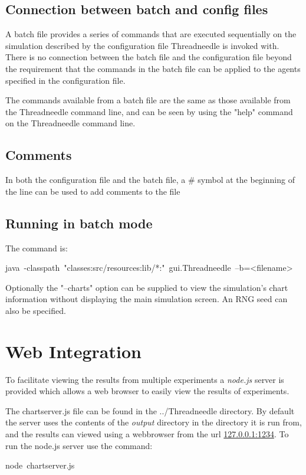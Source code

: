\documentclass[10pt,oneside,openright, a4paper]{memoir}
\begin{document}
\subsection{Connection between batch and config files}
A batch file provides a series of commands that are executed
sequentially on the simulation described by the configuration 
file Threadneedle is invoked with. There is no connection between
the batch file and the configuration file beyond the requirement that
the commands in the batch file can be applied to the agents specified in the 
configuration file. 
\par
The commands available from a batch file are the same as those available from the
Threadneedle command line, and can be seen by using the "help" command
on the Threadneedle command line.
\subsection{Comments}
In both the configuration file and the batch file, a \# symbol at the
beginning of the line can be used to add comments to the file
\subsection{Running in batch mode}
The command is:
\par
\bigskip
\mbox{java -classpath "classes:src/resources:lib/*:" gui.Threadneedle --b=<filename>}

Optionally the "--charts" option can be supplied to view the simulation's 
chart information without displaying the main simulation screen. An RNG seed can
also be specified.

\section{Web Integration}
To facilitate viewing the results from multiple experiments a \emph{node.js}
server is provided which allows a web browser to easily view the
results of experiments. 

The chartserver.js file can be found in the ../Threadneedle directory. By
default the server uses the contents of the \emph{output} directory in
the directory it is run from, and
the results can viewed using a webbrowser from the url \url{127.0.0.1:1234}.
To run the node.js server use the command:
\par
\bigskip
\begin{center}
\mbox{node chartserver.js}
\end{center}
\end{document}
